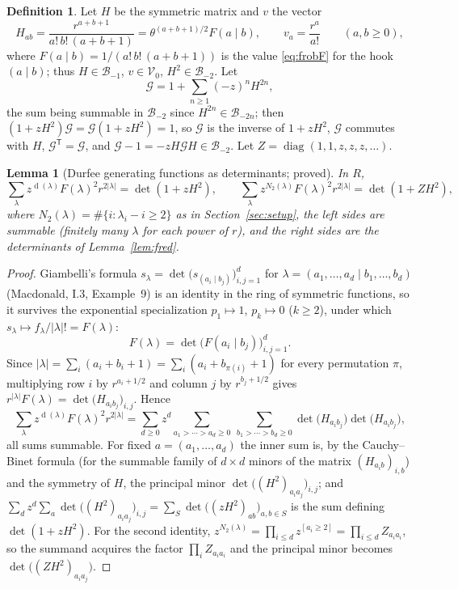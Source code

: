 \documentclass[11pt]{article}
\newtheorem{lemma}[theorem]{Lemma}
\theoremstyle{definition}
\newtheorem{definition}[theorem]{Definition}
\theoremstyle{remark}
\DeclareMathOperator{\Durfee}{d}
\begin{document}
\begin{definition}\label{def:H}
Let $H$ be the symmetric matrix and $v$ the vector
\[
H_{ab}=\frac{r^{a+b+1}}{a!\,b!\,(a+b+1)}=\theta^{(a+b+1)/2}F(a\mid b),\qquad v_a=\frac{r^a}{a!}\qquad(a,b\ge0),
\]
where $F(a\mid b)=1/(a!\,b!\,(a+b+1))$ is the value \eqref{eq:frobF} for the hook $(a\mid b)$; thus $H\in\mathcal B_{-1}$, $v\in\mathcal V_0$, $H^2\in\mathcal B_{-2}$. Let
\[
\mathcal G=1+\sum_{n\ge1}(-z)^nH^{2n},
\]
the sum being summable in $\mathcal B_{-2}$ since $H^{2n}\in\mathcal B_{-2n}$; then $(1+zH^2)\mathcal G=\mathcal G(1+zH^2)=1$, so $\mathcal G$ is the inverse of $1+zH^2$, $\mathcal G$ commutes with $H$, $\mathcal G^{\mathsf T}=\mathcal G$, and $\mathcal G-1=-zH\mathcal GH\in\mathcal B_{-2}$. Let $Z=\operatorname{diag}(1,1,z,z,z,\dots)$.
\end{definition}

\begin{lemma}[Durfee generating functions as determinants; proved]\label{lem:durfeedet}
In $R$,
\begin{equation}\label{eq:durfeedet}
\sum_\lambda z^{\Durfee(\lambda)}F(\lambda)^2r^{2|\lambda|}=\det(1+zH^2),\qquad
\sum_\lambda z^{N_2(\lambda)}F(\lambda)^2r^{2|\lambda|}=\det(1+ZH^2),
\end{equation}
where $N_2(\lambda)=\#\{i:\lambda_i-i\ge2\}$ as in Section~\ref{sec:setup}, the left sides are summable (finitely many $\lambda$ for each power of $r$), and the right sides are the determinants of Lemma~\ref{lem:fred}.
\end{lemma}

\begin{proof}
Giambelli's formula $s_\lambda=\det\bigl(s_{(a_i\mid b_j)}\bigr)_{i,j=1}^d$ for $\lambda=(a_1,\dots,a_d\mid b_1,\dots,b_d)$ (Macdonald, I.3, Example~9) is an identity in the ring of symmetric functions, so it survives the exponential specialization $p_1\mapsto1$, $p_k\mapsto0$ ($k\ge2$), under which $s_\lambda\mapsto f_\lambda/|\lambda|!=F(\lambda)$:
\[
F(\lambda)=\det\bigl(F(a_i\mid b_j)\bigr)_{i,j=1}^d .
\]
Since $|\lambda|=\sum_i(a_i+b_i+1)=\sum_i(a_i+b_{\pi(i)}+1)$ for every permutation $\pi$, multiplying row $i$ by $r^{a_i+1/2}$ and column $j$ by $r^{b_j+1/2}$ gives $r^{|\lambda|}F(\lambda)=\det\bigl(H_{a_ib_j}\bigr)_{i,j}$. Hence
\[
\sum_\lambda z^{\Durfee(\lambda)}F(\lambda)^2r^{2|\lambda|}
=\sum_{d\ge0}z^d\sum_{a_1>\cdots>a_d\ge0}\ \sum_{b_1>\cdots>b_d\ge0}\det\bigl(H_{a_ib_j}\bigr)\det\bigl(H_{a_ib_j}\bigr),
\]
all sums summable. For fixed $a=(a_1,\dots,a_d)$ the inner sum is, by the Cauchy--Binet formula (for the summable family of $d\times d$ minors of the matrix $(H_{a_ib})_{i,b}$) and the symmetry of $H$, the principal minor $\det\bigl((H^2)_{a_ia_j}\bigr)_{i,j}$; and $\sum_dz^d\sum_a\det\bigl((H^2)_{a_ia_j}\bigr)_{i,j}=\sum_S\det\bigl((zH^2)_{ab}\bigr)_{a,b\in S}$ is the sum defining $\det(1+zH^2)$. For the second identity, $z^{N_2(\lambda)}=\prod_{i\le d}z^{[a_i\ge2]}=\prod_{i\le d}Z_{a_ia_i}$, so the summand acquires the factor $\prod_iZ_{a_ia_i}$ and the principal minor becomes $\det\bigl((ZH^2)_{a_ia_j}\bigr)$.
\end{proof}
\end{document}
